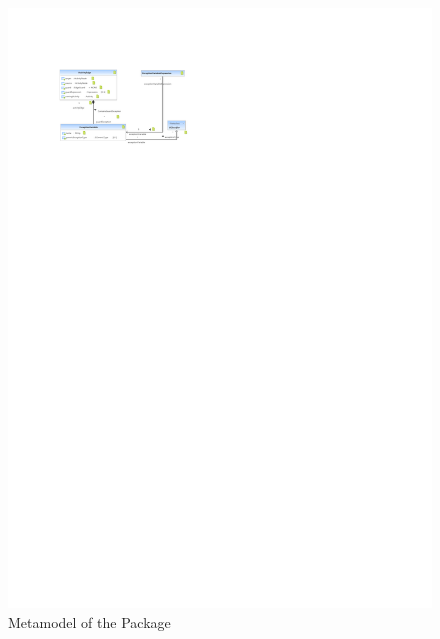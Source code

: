 %
%

\begin{figure}[htb]
  \centering
  \includegraphics[width=\textwidth]{figures/A_technical-reference/packages/storydiagrams_activities_expressions/storydiagrams-activities-expressions}
  \caption{Metamodel of the  Package}
  \label{fig:MM:activities:expressions}
\end{figure}